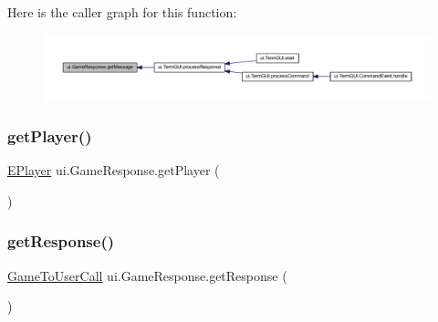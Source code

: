 Here is the caller graph for this function\+:
\nopagebreak
\begin{figure}[H]
\begin{center}
\leavevmode
\includegraphics[width=350pt]{classui_1_1_game_response_aeb684a43f6de864778d44a8efea1ac99_icgraph}
\end{center}
\end{figure}
\mbox{\label{classui_1_1_game_response_a3f3039c398f9ab6a9761ecd25bc3c9e2}} 
\subsubsection{\texorpdfstring{get\+Player()}{getPlayer()}}
{\footnotesize\ttfamily \mbox{\hyperlink{enumgame_1_1_e_player}{E\+Player}} ui.\+Game\+Response.\+get\+Player (\begin{DoxyParamCaption}{ }\end{DoxyParamCaption})\hspace{0.3cm}{\ttfamily [inline]}}

\mbox{\label{classui_1_1_game_response_a07e8690d7e6c9b49792c099896bdd617}} 
\subsubsection{\texorpdfstring{get\+Response()}{getResponse()}}
{\footnotesize\ttfamily \mbox{\hyperlink{enumui_1_1commands_1_1_game_to_user_call}{Game\+To\+User\+Call}} ui.\+Game\+Response.\+get\+Response (\begin{DoxyParamCaption}{ }\end{DoxyParamCaption})\hspace{0.3cm}{\ttfamily [inline]}}


